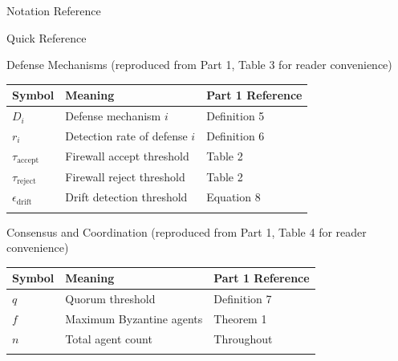 \documentclass[
  ignorenonframetext,
]{beamer}
\newcounter{none} %
\begin{document}
\begin{frame}{Notation Reference}
\begin{block}{Quick Reference}
\begin{block}{Defense Mechanisms (reproduced from Part 1, Table 3 for
reader convenience)}
\protect{}\label{defense-mechanisms-reproduced-from-part-1-table-3-for-reader-convenience}
{\def\LTcaptype{none} %
\begin{longtable}[]{@{}lll@{}}
\toprule\noalign{}
Symbol & Meaning & Part 1 Reference \\
\midrule\noalign{}
\endhead
\(D_i\) & Defense mechanism \(i\) & Definition 5 \\
\(r_i\) & Detection rate of defense \(i\) & Definition 6 \\
\(\tau_{\text{accept}}\) & Firewall accept threshold & Table 2 \\
\(\tau_{\text{reject}}\) & Firewall reject threshold & Table 2 \\
\(\epsilon_{\text{drift}}\) & Drift detection threshold & Equation 8 \\
\bottomrule\noalign{}
\end{longtable}
}
\end{block}

\begin{block}{Consensus and Coordination (reproduced from Part 1, Table
4 for reader convenience)}
\protect{}\label{consensus-and-coordination-reproduced-from-part-1-table-4-for-reader-convenience}
{\def\LTcaptype{none} %
\begin{longtable}[]{@{}lll@{}}
\toprule\noalign{}
Symbol & Meaning & Part 1 Reference \\
\midrule\noalign{}
\endhead
\(q\) & Quorum threshold & Definition 7 \\
\(f\) & Maximum Byzantine agents & Theorem 1 \\
\(n\) & Total agent count & Throughout \\
\bottomrule\noalign{}
\end{longtable}
}
\end{block}


\end{block}
\end{frame}
\end{document}
